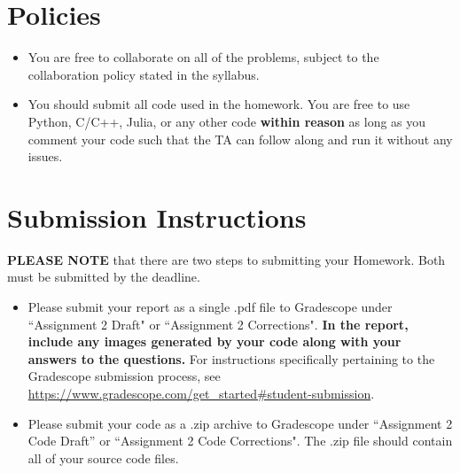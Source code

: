 \newif\ifshowsolutions
\showsolutionsfalse




\pagestyle{fancy}

\section*{Policies}
\begin{itemize}
  \item You are free to collaborate on all of the problems, subject to the collaboration policy stated in the syllabus.
  \item You should submit all code used in the homework.
        You are free to use Python, C/C++, Julia, or any other code \textbf{within reason} as long as you comment your code such that the TA can follow along and run it without any issues.
\end{itemize}

\section*{Submission Instructions}
\textbf{PLEASE NOTE} that there are two steps to submitting your Homework.
Both must be submitted by the deadline.

\begin{itemize}
  \item Please submit your report as a single .pdf file to Gradescope under ``Assignment 2 Draft" or ``Assignment 2 Corrections".
        \textbf{In the report, include any images generated by your code along with your answers to the questions.}
        For instructions specifically pertaining to the Gradescope submission process, see \url{https://www.gradescope.com/get_started#student-submission}.
  \item Please submit your code as a .zip archive to Gradescope under ``Assignment 2 Code Draft'' or ``Assignment 2 Code Corrections".
        The .zip file should contain all of your source code files.
\end{itemize}

